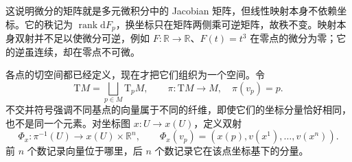 这说明微分的矩阵就是多元微积分中的 Jacobian 矩阵，但线性映射本身不依赖坐标。它的秩记为 \(\operatorname{rank}\mathrm{d}F_p\)，换坐标只在矩阵两侧乘可逆矩阵，故秩不变。映射本身双射并不足以使微分可逆，例如 \(F:\mathbb R\to\mathbb R\)、\(F(t)=t^3\) 在零点的微分为零；它的逆虽连续，却在零点不可微。

\ProseParagraphBreak

各点的切空间都已经定义，现在才把它们组织为一个空间。令
\[
	\mathrm{T}M=\bigsqcup_{p\in M}\mathrm{T}_pM,\qquad \pi:\mathrm{T}M\longrightarrow M,\quad \pi(v_p)=p.
\]
不交并符号强调不同基点的向量属于不同的纤维，即使它们的坐标分量恰好相同，也不是同一个元素。对坐标图 \(x:U\to x(U)\)，定义双射
\[
	\Phi_x:\pi^{-1}(U)\longrightarrow x(U)\times\mathbb R^n,\qquad
	\Phi_x(v_p)=(x(p),v(x^1),\ldots,v(x^n)).
\]
前 \(n\) 个数记录向量位于哪里，后 \(n\) 个数记录它在该点坐标基下的分量。

